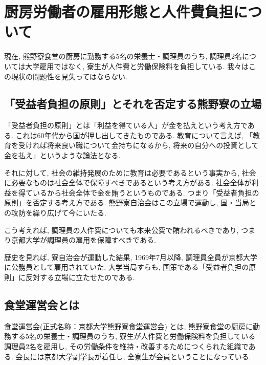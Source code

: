 \section{厨房労働者の雇用形態と人件費負担について}\label{sec:tyuboin}

	現在, 熊野寮食堂の厨房に勤務する5名の栄養士・調理員のうち, 調理員2名については大学雇用ではなく, 寮生が人件費と労働保険料を負担している. 我々はこの現状の問題性を見失ってはならない.

		\subsection{「受益者負担の原則」とそれを否定する熊野寮の立場}

	「受益者負担の原則」とは「利益を得ている人」が金を払えという考え方である. これは60年代から国が押し出してきたものである. 教育について言えば, 「教育を受ければ将来良い職について金持ちになるから, 将来の自分への投資として金を払え」というような論法となる.

	それに対して, 社会の維持発展のために教育は必要であるという事実から, 社会に必要なものは社会全体で保障すべきであるという考え方がある. 社会全体が利益を得ているから社会全体で金を賄うというものである.
	つまり「受益者負担の原則」を否定する考え方である. 熊野寮自治会はこの立場で運動し, 国・当局との攻防を繰り広げて今にいたる.

	こう考えれば, 調理員の人件費についても本来公費で賄われるべきであり, つまり京都大学が調理員の雇用を保障すべきである.

	歴史を見れば, 寮自治会が運動した結果, 1969年7月以降, 調理員全員が京都大学に公務員として雇用されていた. 大学当局すらも, 国策である「受益者負担の原則」に反対する立場に立たせたのである.


		\subsection{食堂運営会とは}

		食堂運営会(正式名称：京都大学熊野寮食堂運営会) とは, 熊野寮食堂の厨房に勤務する5名の栄養士・調理員のうち, 寮生が人件費と労働保険料を負担している調理員2名を雇用し, その労働条件を維持・改善するためにつくられた組織である. 会長には京都大学副学長が着任し, 全寮生が会員ということになっている.

